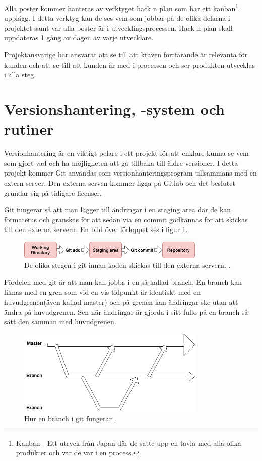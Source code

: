 \documentclass[a4paper,12pt,oneside,final]{extbook}
\begin{document}
Alla poster kommer hanteras av verktyget hack n plan som har ett kanban\footnote{Kanban - Ett utryck från Japan där de satte upp en tavla med alla olika produkter och var de var i en process.} upplägg. I detta verktyg kan de ses vem som jobbar på de olika delarna i projektet samt var alla poster är i utvecklingsprocessen. Hack n plan skall uppdateras 1 gång av dagen av varje utvecklare.

Projektansvarige har ansvarat att se till att kraven fortfarande är relevanta för kunden och att se till att kunden är med i processen och ser produkten utvecklas i alla steg.

\section{Versionshantering, -system och rutiner}
Versionhantering är en viktigt pelare i ett projekt för att enklare kunna se vem som gjort vad och ha möjligheten att gå tillbaka till äldre versioner. I detta projekt kommer Git användas som versionhanteringsprogram tillsammans med en extern server. Den externa serven kommer ligga på Gitlab och det beslutet grundar sig på tidigare licenser.

Git fungerar så att man lägger till ändringar i en staging area\cite{Staging} där de kan formateras och  granskas för att sedan via en commit godkännas för att skickas till den externa servern. En bild över förloppet ses i figur \ref{fig:Gitcommit}.

\begin{figure}[H]
	\includegraphics[width=0.8\textwidth, center]{Git.png}
	\caption{De olika stegen i git innan koden skickas till den externa servern. \cite{Staging}.}
	\label{fig:Gitcommit}
\end{figure}
Fördelen med git är att man kan jobba i en så kallad branch. En branch kan liknas med en gren som vid en vis tidpunkt är identiskt med en huvudgrenen(även kallad master) och på grenen kan ändringar ske utan att ändra på huvudgrenen. Sen när ändringar är gjorda i sitt fullo på en branch så sätt den samman med huvudgrenen. 
\begin{figure}[H]
	\includegraphics[width=0.8\textwidth, center]{branch.png}
	\caption{Hur en branch i git fungerar \cite{Branch}.}
	\label{fig:Gitbranch}
\end{figure}
\end{document}
